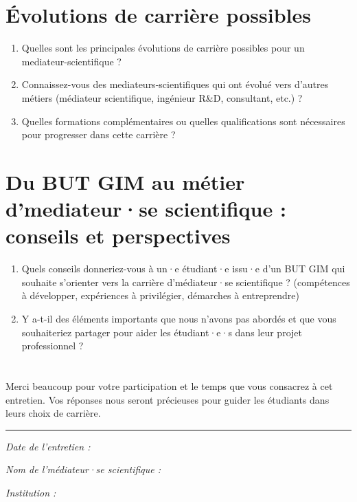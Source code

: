 \documentclass[a4paper,11pt]{article}
\begin{document}
\section{Évolutions de carrière possibles}

\begin{enumerate}[leftmargin=*]
    \item Quelles sont les principales évolutions de carrière possibles pour un mediateur-scientifique ?

    \item Connaissez-vous des mediateurs-scientifiques qui ont évolué vers d'autres métiers (médiateur scientifique, ingénieur R\&D, consultant, etc.) ?

    \item Quelles formations complémentaires ou quelles qualifications sont nécessaires pour progresser dans cette carrière ?
\end{enumerate}

\section{Du BUT GIM au métier d'mediateur·se scientifique : conseils et perspectives}

\begin{enumerate}[leftmargin=*]
    \item Quels conseils donneriez-vous à un·e étudiant·e issu·e d'un BUT GIM qui souhaite s'orienter vers la carrière d'médiateur·se scientifique ? (compétences à développer, expériences à privilégier, démarches à entreprendre)

    \item Y a-t-il des éléments importants que nous n'avons pas abordés et que vous souhaiteriez partager pour aider les étudiant·e·s dans leur projet professionnel ?
\end{enumerate}

\vspace{1cm}

\section*{}

Merci beaucoup pour votre participation et le temps que vous consacrez à cet entretien. Vos réponses nous seront précieuses pour guider les étudiants dans leurs choix de carrière.

\vspace{0.5cm}

\noindent\rule{\textwidth}{0.4pt}

\vspace{0.3cm}

\noindent\textit{Date de l'entretien : \underline{\hspace{4cm}}}

\noindent\textit{Nom de l'médiateur·se scientifique : \underline{\hspace{6cm}}}

\noindent\textit{Institution : \underline{\hspace{8cm}}}
\end{document}
